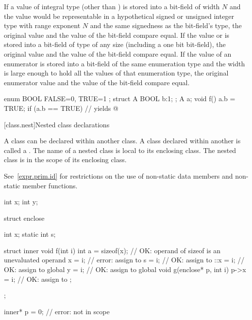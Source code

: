 \pnum
If a value of integral type (other than ) is stored
into a bit-field of width $N$ and the value would be representable
in a hypothetical signed or unsigned integer type
with range exponent $N$ and the same signedness as the bit-field's type,
the original value and the value of the bit-field compare equal.
If the value  or  is stored into a bit-field of
type  of any size (including a one bit bit-field), the
original  value and the value of the bit-field compare
equal. If the value of an enumerator is stored into a bit-field of the
same enumeration type and the width is large
enough to hold all the values of that enumeration type,
the original enumerator value and the value of the bit-field compare equal.
\begin{example}

\begin{codeblock}
enum BOOL { FALSE=0, TRUE=1 };
struct A {
  BOOL b:1;
};
A a;
void f() {
  a.b = TRUE;
  if (a.b == TRUE)              // yields 
    { @\commentellip@ }
}
\end{codeblock}
\end{example}

[class.nest]{Nested class declarations}%
%

\pnum
A class can be declared within another class. A class declared within
another is called a . The name of a nested class
is local to its enclosing class.
%
The nested class is in the scope of its enclosing class.
\begin{note}
See~\ref{expr.prim.id} for restrictions on the use of non-static data
members and non-static member functions.
\end{note}

\begin{example}
\begin{codeblock}
int x;
int y;

struct enclose {
  int x;
  static int s;

  struct inner {
    void f(int i) {
      int a = sizeof(x);        // OK: operand of sizeof is an unevaluated operand
      x = i;                    // error: assign to 
      s = i;                    // OK: assign to 
      ::x = i;                  // OK: assign to global 
      y = i;                    // OK: assign to global 
    }
    void g(enclose* p, int i) {
      p->x = i;                 // OK: assign to 
    }
  };
};

inner* p = 0;                   // error:  not in scope
\end{codeblock}
\end{example}

